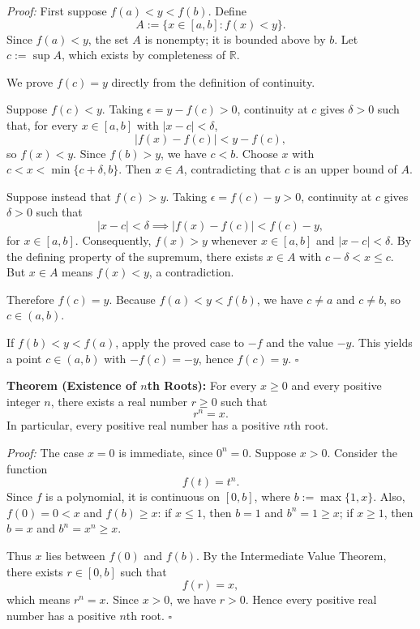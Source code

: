 \documentclass[a4paper,11pt,abstracton]{scrartcl}
\newcommand{\RR}{\mathbb{R}}
\theoremstyle{dotlessP}
\theoremstyle{dotlessS}
\theoremstyle{remark}
\theoremstyle{definition}
\begin{document}
\begin{claim_box}
\textit{Proof:}
First suppose $f(a)<y<f(b)$. Define
\[
    A:=\{x\in[a,b]:f(x)<y\}.
\]
Since $f(a)<y$, the set $A$ is nonempty; it is bounded above by $b$. Let $c:=\sup A$, which exists by completeness of $\RR$.

We prove $f(c)=y$ directly from the definition of continuity.

Suppose $f(c)<y$. Taking $\epsilon=y-f(c)>0$, continuity at $c$ gives $\delta>0$ such that, for every $x\in[a,b]$ with $|x-c|<\delta$,
\[
    |f(x)-f(c)|<y-f(c),
\]
so $f(x)<y$. Since $f(b)>y$, we have $c<b$. Choose $x$ with $c<x<\min\{c+\delta,b\}$. Then $x\in A$, contradicting that $c$ is an upper bound of $A$.

Suppose instead that $f(c)>y$. Taking $\epsilon=f(c)-y>0$, continuity at $c$ gives $\delta>0$ such that
\[
    |x-c|<\delta\implies |f(x)-f(c)|<f(c)-y,
\]
for $x\in[a,b]$. Consequently, $f(x)>y$ whenever $x\in[a,b]$ and $|x-c|<\delta$. By the defining property of the supremum, there exists $x\in A$ with $c-\delta<x\le c$. But $x\in A$ means $f(x)<y$, a contradiction.

Therefore $f(c)=y$. Because $f(a)<y<f(b)$, we have $c\ne a$ and $c\ne b$, so $c\in(a,b)$.

If $f(b)<y<f(a)$, apply the proved case to $-f$ and the value $-y$. This yields a point $c\in(a,b)$ with $-f(c)=-y$, hence $f(c)=y$.
\hfill$\square$
\end{claim_box}

\begin{problem_box}
\textbf{Theorem (Existence of $n$th Roots):}
For every $x\ge 0$ and every positive integer $n$, there exists a real number $r\ge 0$ such that
\[
    r^n=x.
\]
In particular, every positive real number has a positive $n$th root.
\end{problem_box}

\begin{claim_box}
\textit{Proof:}
The case $x=0$ is immediate, since $0^n=0$. Suppose $x>0$. Consider the function
\[
    f(t)=t^n.
\]
Since $f$ is a polynomial, it is continuous on $[0,b]$, where $b:=\max\{1,x\}$. Also, $f(0)=0<x$ and $f(b)\ge x$: if $x\le 1$, then $b=1$ and $b^n=1\ge x$; if $x\ge 1$, then $b=x$ and $b^n=x^n\ge x$.

Thus $x$ lies between $f(0)$ and $f(b)$. By the Intermediate Value Theorem, there exists $r\in[0,b]$ such that
\[
    f(r)=x,
\]
which means $r^n=x$. Since $x>0$, we have $r>0$. Hence every positive real number has a positive $n$th root.
\hfill$\square$
\end{claim_box}
\end{document}

